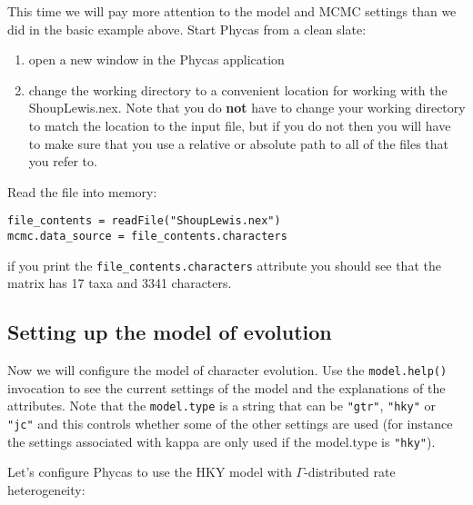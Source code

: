 \documentclass{article}
\newcommand{\cmd}[1]{\texttt{#1}\xspace}
\newcommand{\phycas}{Phycas\xspace}
\newcommand{\localfile}[1]{\textsf{#1}\xspace}
\begin{document}
This time we will pay more attention to the model and MCMC settings than we did in the basic example above.
Start \phycas from a clean slate:
\begin{enumerate}
	\item open a new window in the \phycas application
	\item change the working directory to a convenient location for working with the \localfile{ShoupLewis.nex}. Note that you do {\bf not} have to change your working directory to match the location to the input file, but if you do not then you will have to make sure that you use a relative or absolute path to all of the files that you refer to.
\end{enumerate}

Read the file into memory:
\begin{verbatim}
file_contents = readFile("ShoupLewis.nex")
mcmc.data_source = file_contents.characters
\end{verbatim}
if you print the \cmd{file\_contents.characters} attribute you should see that the matrix has 17 taxa and 3341 characters.

\subsection{Setting up the model of evolution}
Now we will configure the model of character evolution. 
Use the \cmd{model.help()} invocation to see the current settings of the model and the explanations of the
attributes.
Note that the \cmd{model.type} is a string that can be \texttt{"gtr"}, \texttt{"hky"} or \texttt{"jc"} and this controls whether some of the other settings are used (for instance the settings associated with kappa are only used if the model.type is \texttt{"hky"}).

Let's configure \phycas to use the HKY model with $\Gamma$-distributed rate heterogeneity:
\end{document}
